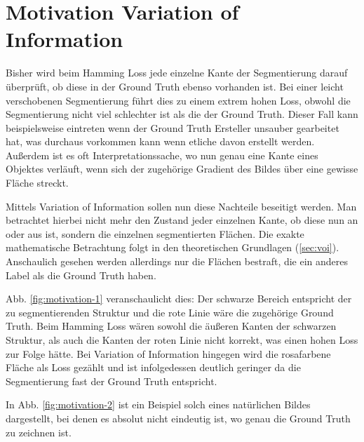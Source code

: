 \section{Motivation Variation of Information}\label{sec:motivation}

Bisher wird beim Hamming Loss jede einzelne Kante der Segmentierung darauf überprüft, ob diese in der Ground Truth ebenso vorhanden ist. Bei einer leicht verschobenen Segmentierung führt dies zu einem extrem hohen Loss, obwohl die Segmentierung nicht viel schlechter ist als die der Ground Truth. Dieser Fall kann beispielsweise eintreten wenn der Ground Truth Ersteller unsauber gearbeitet hat, was durchaus vorkommen kann wenn etliche davon erstellt werden. Außerdem ist es oft Interpretationssache, wo nun genau eine Kante eines Objektes verläuft, wenn sich der zugehörige Gradient des Bildes über eine gewisse Fläche streckt. 

Mittels Variation of Information sollen nun diese Nachteile beseitigt werden. Man betrachtet hierbei nicht mehr den Zustand jeder einzelnen Kante, ob diese nun an oder aus ist, sondern  die einzelnen segmentierten Flächen. Die exakte mathematische Betrachtung folgt in den theoretischen Grundlagen (\ref{sec:voi}). Anschaulich gesehen werden allerdings nur die Flächen bestraft, die ein anderes Label als die Ground Truth haben.

Abb. \ref{fig:motivation-1} veranschaulicht dies: Der schwarze Bereich entspricht der zu segmentierenden Struktur und die rote Linie wäre die zugehörige Ground Truth. Beim Hamming Loss wären sowohl die äußeren Kanten der schwarzen Struktur, als auch die Kanten der roten Linie nicht korrekt, was einen hohen Loss zur Folge hätte. Bei Variation of Information hingegen wird die rosafarbene Fläche als Loss gezählt und ist infolgedessen deutlich geringer da die Segmentierung fast der Ground Truth entspricht.

In Abb. \ref{fig:motivation-2} ist ein Beispiel solch eines natürlichen Bildes dargestellt, bei denen es absolut nicht eindeutig ist, wo genau die Ground Truth zu zeichnen ist.


\begin{figure}[H]
	\centering
	\hfill
\end{figure}
\vspace{-0.5cm}
\label{fig:motivation}


